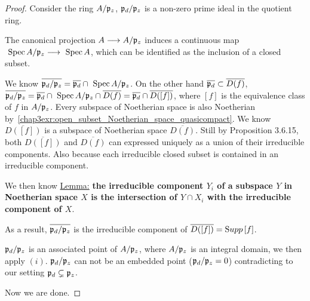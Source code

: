 \begin{proof}
 Consider the ring $A/{\mathfrak p}_z$, ${\mathfrak p}_d/{\mathfrak p}_z$ is a non-zero prime ideal in the quotient ring. 

The canonical projection $A\longrightarrow A/{\mathfrak p}_z$ induces a continuous map $\text{ Spec\,} A/{\mathfrak p}_z\longrightarrow \text{ Spec\,} A$, which can be identified as the inclusion of a closed subset.

We know $\overline{{\mathfrak p}_d/{\mathfrak p}_z}=\overline{{\mathfrak p}_d}\cap \text{ Spec\,} A/{\mathfrak p}_z$. On the other hand
$\overline{{\mathfrak p}_d}\subset \overline{D(f)}$, $\overline{{\mathfrak p}_d/{\mathfrak p}_z}=\overline{{\mathfrak p}_d}\cap \text{ Spec\,} A/{\mathfrak p}_z\cap \overline{D(f)}=\overline{{\mathfrak p}_d}\cap \overline{D([f])}$, where $[f]$ is the equivalence class of $f$ in $A/{\mathfrak p}_z$. Every subspace of Noetherian space is also Noetherian by~\ref{chap3exr:open_subset_Noetherian_space_quasicompact}. We know $\overline{D([f])}$ is a subspace of Noetherian space $\overline{D(f)}$. Still by Proposition 3.6.15, both $\overline{D([f])}$ and $\overline{D(f)}$
can expressed uniquely as a union of their irreducible components. Also because each irreducible closed subset is contained in an irreducible component. 

We then know
\underline{Lemma:}
\textbf{ the irreducible component $Y_i$ of a subspace $Y$ in Noetherian space $X$ is the intersection of $Y\cap X_i$ with the irreducible component of $X$}.

As a result, $\overline{{\mathfrak p}_d/{\mathfrak p}_z}$ is the irreducible component of $\overline{D([f])}={\text Supp\thinspace} [f]$.

${\mathfrak p}_d/{\mathfrak p}_z$ is an associated point of $A/{\mathfrak p}_z$, where $A/{\mathfrak p}_z$ is an integral domain, we then apply $(i)$. ${\mathfrak p}_d/{\mathfrak p}_z$ can not be an embedded point (${\mathfrak p}_d/{\mathfrak p}_z=0$) contradicting to our setting ${\mathfrak p}_d\subsetneq {\mathfrak p}_z$.

Now we are done.

 

\end{proof}

